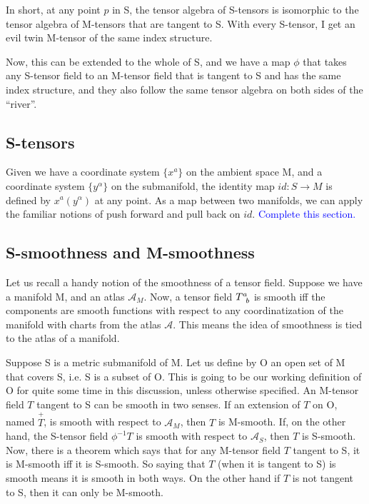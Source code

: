 In short, at any point $p$ in S, the tensor algebra of S-tensors is isomorphic to the tensor algebra of M-tensors that are tangent to S. With every S-tensor, I get an evil twin M-tensor of the same index structure.

Now, this can be extended to the whole of S, and we have a map $ \phi$ that takes any S-tensor field to an M-tensor field that is tangent to S and has the same index structure, and they also follow the same tensor algebra on both sides of the ``river''.





\subsection{S-tensors}
Given we have a coordinate system $ \{x^a\}$ on the ambient space M, and a coordinate system $ \{y^{\alpha}\}$ on the submanifold, the identity map $ id: S \longrightarrow M$ is defined by $ x^a(y^{\alpha})$ at any point. As a map between two manifolds, we can apply the familiar notions of push forward and pull back on $ id$. 
\textcolor{blue}{Complete this section.}






\subsection{S-smoothness and M-smoothness}

Let us recall  a handy notion of the smoothness of a tensor field. Suppose we have a manifold M, and an atlas $ \mathcal{A}_M$. Now, a tensor field $ \tt{T}{a}{b}$ is smooth iff the components are smooth functions with respect to any coordinatization of the manifold with charts from the atlas $ \mathcal{A}$. This means the idea of smoothness is tied to the atlas of a manifold. 

Suppose S is a metric submanifold of M. Let us define by O an open set of M that covers S, i.e. S is a subset of O. This is going to be our working definition of O for quite some time in this discussion, unless otherwise specified. An M-tensor field $T$ tangent to S can be smooth in two senses. If an extension of $T$  on O, named $ \overset{+}{T}$, is smooth  with respect to $ \mathcal{A}_M$, then $T$  is M-smooth. If, on the other hand, the S-tensor field $ \phi^{-1} T$ is smooth  with respect to $ \mathcal{A}_S$, then $T$  is S-smooth. Now, there is a theorem which says that for any M-tensor field $T$  tangent to S, it is M-smooth iff it is S-smooth. So saying that $T$  (when it is tangent to S) is smooth means it is smooth in both ways. On the other hand if  $T$  is not tangent to S, then it can only be M-smooth.





